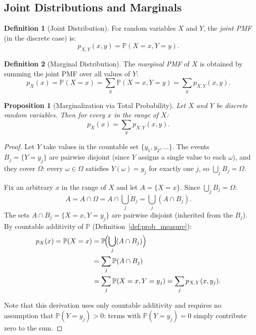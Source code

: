 \documentclass[11pt,a4paper]{article}
\theoremstyle{definition}
\newtheorem{definition}{Definition}[section]
\theoremstyle{plain}
\newtheorem{proposition}[theorem]{Proposition}
\theoremstyle{remark}
\newcommand{\Prob}{\mathbb{P}}
\begin{document}
\subsection{Joint Distributions and Marginals}
\label{subsec:joint}

\begin{definition}[Joint Distribution]
\label{def:joint}
For random variables $X$ and $Y$, the \emph{joint PMF} (in the discrete case) is:
\begin{equation}
    p_{X,Y}(x, y) = \Prob(X = x, Y = y).
    \label{eq:joint_pmf}
\end{equation}
\end{definition}

\begin{definition}[Marginal Distribution]
\label{def:marginal}
The \emph{marginal PMF} of $X$ is obtained by summing the joint PMF over all values of $Y$:
\begin{equation}
    p_X(x) = \Prob(X = x) = \sum_y \Prob(X = x, Y = y) = \sum_y p_{X,Y}(x, y).
    \label{eq:marginal}
\end{equation}
\end{definition}

\begin{proposition}[Marginalization via Total Probability]
\label{prop:marginalization}
Let $X$ and $Y$ be discrete random variables. Then for every $x$ in the range of $X$:
\[
    p_X(x) = \sum_y p_{X,Y}(x,y).
\]
\end{proposition}

\begin{proof}
Let $Y$ take values in the countable set $\{y_1, y_2, \ldots\}$. The events $B_j = \{Y = y_j\}$ are pairwise disjoint (since $Y$ assigns a single value to each $\omega$), and they cover $\Omega$: every $\omega \in \Omega$ satisfies $Y(\omega) = y_j$ for exactly one $j$, so $\bigcup_j B_j = \Omega$.

Fix an arbitrary $x$ in the range of $X$ and let $A = \{X = x\}$. Since $\bigcup_j B_j = \Omega$:
\[
    A = A \cap \Omega = A \cap \bigcup_j B_j = \bigcup_j (A \cap B_j).
\]
The sets $A \cap B_j = \{X = x, Y = y_j\}$ are pairwise disjoint (inherited from the $B_j$). By countable additivity of $\Prob$ (Definition~\ref{def:prob_measure}):
\begin{align}
    p_X(x) = \Prob(X = x) &= \Prob\!\Bigl(\bigcup_j (A \cap B_j)\Bigr) \nonumber\\
    &= \sum_j \Prob(A \cap B_j) \nonumber\\
    &= \sum_j \Prob(X = x, Y = y_j) = \sum_j p_{X,Y}(x, y_j). \label{eq:marginalization_proof}
\end{align}

Note that this derivation uses only countable additivity and requires no assumption that $\Prob(Y = y_j) > 0$: terms with $\Prob(Y = y_j) = 0$ simply contribute zero to the sum.
\end{proof}
\end{document}
